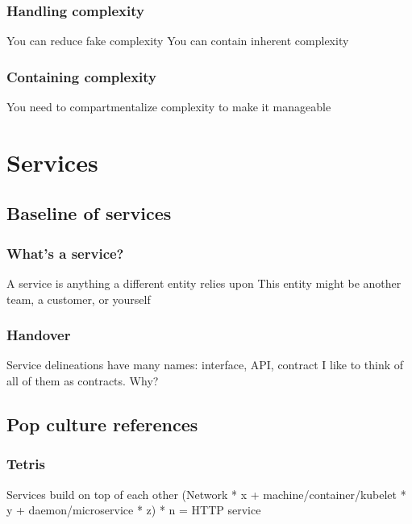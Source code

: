 \documentclass[t]{beamer}
\begin{document}
\begin{frame}
	\frametitle{Handling complexity}
	\begin{center}
		\vfill
		You can reduce fake complexity
		\vfill
		You can contain inherent complexity
		\vfill
	\end{center}
\end{frame}

\begin{frame}
	\frametitle{Containing complexity}
	\begin{center}
		\vfill
		You need to compartmentalize complexity to make it manageable
		\vfill
	\end{center}
\end{frame}



\section{Services}


\subsection{Baseline of services}

\begin{frame}
	\frametitle{What's a service?}
	\begin{center}
		\vfill
		A service is anything a different entity relies upon
		\vfill
		This entity might be another team, a customer, or yourself
		\vfill
	\end{center}
\end{frame}

\begin{frame}
	\frametitle{Handover}
	\begin{center}
		\vfill
		Service delineations have many names: interface, API, contract
		\vfill
		I like to think of all of them as contracts. Why?
		\vfill
	\end{center}
\end{frame}


\subsection{Pop culture references}

\begin{frame}
	\frametitle{Tetris}
	\begin{center}
		\vfill
		Services build on top of each other
		\vfill
		(Network * x + machine/container/kubelet * y + daemon/microservice * z) * n = HTTP service
		\vfill
	\end{center}
\end{frame}
\end{document}
